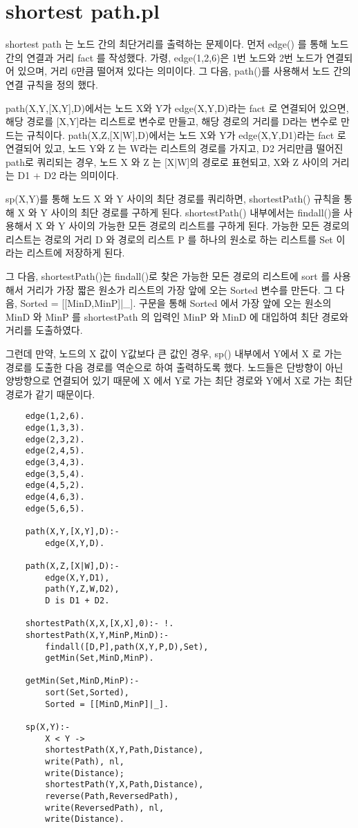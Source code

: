 \documentclass{article}
\begin{document}
\newpage

\section{shortest path.pl}
shortest path 는 노드 간의 최단거리를 출력하는 문제이다.
먼저 edge() 를 통해 노드 간의 연결과 거리 fact 를 작성했다.
가령, edge(1,2,6)은 1번 노드와 2번 노드가 연결되어 있으며, 거리 6만큼 떨어져 있다는 의미이다.
그 다음, path()를 사용해서 노드 간의 연결 규칙을 정의 했다.

path(X,Y,[X,Y],D)에서는 노드 X와 Y가 edge(X,Y,D)라는 fact 로 연결되어 있으면,
해당 경로를 [X,Y]라는 리스트로 변수로 만들고, 해당 경로의 거리를 D라는 변수로 만드는 규칙이다.
path(X,Z,[X|W],D)에서는 노드 X와 Y가 edge(X,Y,D1)라는 fact 로 연결되어 있고,
노드 Y와 Z 는 W라는 리스트의 경로를 가지고, D2 거리만큼 떨어진 path로 쿼리되는 경우,
노드 X 와 Z 는 [X|W]의 경로로 표현되고, X와 Z 사이의 거리는 D1 + D2 라는 의미이다.

sp(X,Y)를 통해 노드 X 와 Y 사이의 최단 경로를 쿼리하면, shortestPath() 규칙을 통해
X 와 Y 사이의 최단 경로를 구하게 된다. shortestPath() 내부에서는 findall()을 사용해서
X 와 Y 사이의 가능한 모든 경로의 리스트를 구하게 된다. 가능한 모든 경로의 리스트는 경로의 거리 D 와
경로의 리스트 P 를 하나의 원소로 하는 리스트를 Set 이라는 리스트에 저장하게 된다.

그 다음, shortestPath()는 findall()로 찾은 가능한 모든 경로의 리스트에 sort 를 사용해서
거리가 가장 짧은 원소가 리스트의 가장 앞에 오는 Sorted 변수를 만든다.
그 다음, Sorted = [[MinD,MinP]|\_]. 구문을 통해 Sorted 에서 가장 앞에 오는 원소의
MinD 와 MinP 를 shortestPath 의 입력인 MinP 와 MinD 에 대입하여 최단 경로와 거리를 도출하였다.

그런데 만약, 노드의 X 값이 Y값보다 큰 값인 경우, sp() 내부에서 Y에서 X 로 가는 경로를 도출한 다음
경로를 역순으로 하여 출력하도록 했다. 노드들은 단방향이 아닌 양방향으로 연결되어 있기 때문에
X 에서 Y로 가는 최단 경로와 Y에서 X로 가는 최단 경로가 같기 때문이다.


\begin{lstlisting}
	edge(1,2,6).
	edge(1,3,3).
	edge(2,3,2).
	edge(2,4,5).
	edge(3,4,3).
	edge(3,5,4).
	edge(4,5,2).
	edge(4,6,3).
	edge(5,6,5).
	
	path(X,Y,[X,Y],D):- 
		edge(X,Y,D).
	
	path(X,Z,[X|W],D):- 
		edge(X,Y,D1), 
		path(Y,Z,W,D2), 
		D is D1 + D2.
	
	shortestPath(X,X,[X,X],0):- !.
	shortestPath(X,Y,MinP,MinD):-
		findall([D,P],path(X,Y,P,D),Set),
		getMin(Set,MinD,MinP).
	
	getMin(Set,MinD,MinP):-
		sort(Set,Sorted),
		Sorted = [[MinD,MinP]|_].
	
	sp(X,Y):-
		X < Y ->
		shortestPath(X,Y,Path,Distance),
		write(Path), nl,
		write(Distance);
		shortestPath(Y,X,Path,Distance),
		reverse(Path,ReversedPath),
		write(ReversedPath), nl,
		write(Distance).
\end{lstlisting}
\end{document}
